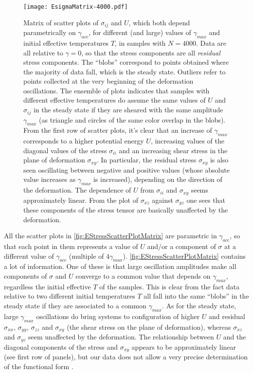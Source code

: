 \begin{figure}[!hp] 
\centering 
\texttt{[image: EsigmaMatrix-4000.pdf]} 
\caption{Matrix of scatter plots of $\sigma_{ij}$ and $U$, which both depend parametrically on $\gamma_{acc}$, for different (and large) values of $\gamma_{max}$ and initial effective temperatures $T$, in samples with $N=4000$. Data are all relative to $\gamma=0$, so that the stress components are all \emph{residual} stress components. The ``blobs'' correspond to points obtained where the majority of data fall, which is the steady state. Outliers refer to points collected at the very beginning of the deformation oscillations. 
The ensemble of plots indicates that samples with different effective temperatures do assume the same values of $U$ and $\sigma_{ij}$ in the steady state if they are sheared with the same amplitude $\gamma_{max}$ (as triangle and circles of the same color overlap in the blobs).
From the first row of scatter plots, it's clear that an increase of $\gamma_{max}$ corresponds to a higher potential energy $U$, increasing values of the diagonal values of the stress $\sigma_{ii}$ and an increasing shear stress in the plane of deformation $\sigma_{xy}$. In particular, the residual stress $\sigma_{xy}$ is also seen oscillating between negative and positive values (whose absolute value increases as $\gamma_{max}$ is increased), depending on the direction of the deformation. The dependence of $U$ from $\sigma_{ii}$ and $\sigma_{xy}$ seems approximately linear.
From the plot of $\sigma_{xz}$ against $\sigma_{yz}$ one sees that these components of the stress tensor are basically unaffected by the deformation. \label{fig:EStressScatterPlotMatrix}}
\end{figure}

All the scatter plots in \autoref{fig:EStressScatterPlotMatrix} are parametric in $\gamma_{acc}$, so that each point in them represents a value of $U$ and/or a component of $\sigma$ at a different value of $\gamma_{acc}$ (multiple of $4\gamma_{max}$). \autoref{fig:EStressScatterPlotMatrix} contains a lot of information. One of these is that large oscillation amplitudes make all components of $\sigma$ and $U$ converge to a common value that depends on $\gamma_{max}$, regardless the initial effective $T$ of the samples. This is clear from the fact data relative to two different initial temperatures $T$ all fall into the same ``blobs'' in the steady state if they are associated to a common $\gamma_{max}$. As for the steady state, large $\gamma_{max}$ oscillations do bring systems to configuration of higher $U$ and residual $\sigma_{xx}$, $\sigma_{yy}$, $\sigma_{zz}$ and $\sigma_{xy}$ (the shear stress on the plane of deformation), whereas $\sigma_{xz}$ and $\sigma_{yz}$ seem unaffected by the deformation. The relationship between $U$ and the diagonal components of the stress and $\sigma_{xy}$ appears to be approximately linear (see first row of panels), but our data does not allow a very precise determination of the functional form \cite{bouchbinder2013private}. 

